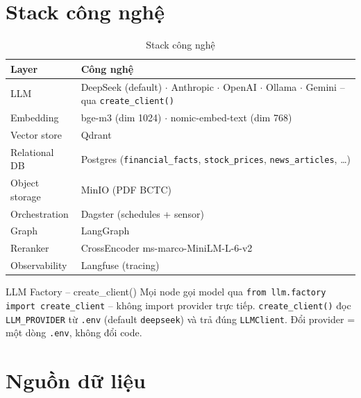 \documentclass[12pt, a4paper]{report}
\begin{document}
\section{Stack công nghệ}

\begin{table}[H]
\centering
\caption{Stack công nghệ}
\small
\begin{tabularx}{\textwidth}{lX}
\toprule
\textbf{Layer} & \textbf{Công nghệ} \\
\midrule
LLM & DeepSeek (default) $\cdot$ Anthropic $\cdot$ OpenAI $\cdot$ Ollama $\cdot$ Gemini -- qua \texttt{create\_client()} \\
\rowcolor{rowgray}
Embedding & bge-m3 (dim 1024) $\cdot$ nomic-embed-text (dim 768) \\
Vector store & Qdrant \\
\rowcolor{rowgray}
Relational DB & Postgres (\texttt{financial\_facts}, \texttt{stock\_prices}, \texttt{news\_articles}, \ldots) \\
Object storage & MinIO (PDF BCTC) \\
\rowcolor{rowgray}
Orchestration & Dagster (schedules + sensor) \\
Graph & LangGraph \\
\rowcolor{rowgray}
Reranker & CrossEncoder ms-marco-MiniLM-L-6-v2 \\
Observability & Langfuse (tracing) \\
\bottomrule
\end{tabularx}
\end{table}

\begin{keybox}{LLM Factory -- create\_client()}
Mọi node gọi model qua \texttt{from llm.factory import create\_client} -- không import provider trực tiếp. \texttt{create\_client()} đọc \texttt{LLM\_PROVIDER} từ \texttt{.env} (default \texttt{deepseek}) và trả đúng \texttt{LLMClient}. Đổi provider = một dòng \texttt{.env}, không đổi code.
\end{keybox}

\section{Nguồn dữ liệu}
\end{document}
